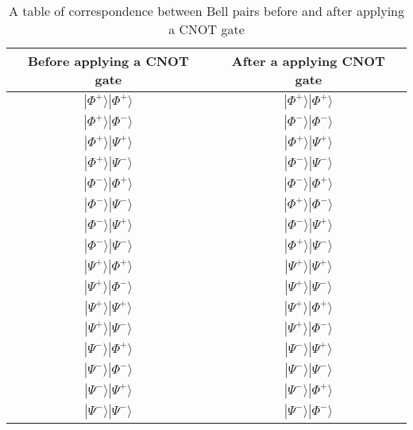 \begin{table}[ht]
  \begin{center}
    \begin{tabular}{|c|c|} \hline
      Before applying a CNOT gate & After a applying CNOT gate \\ \hline \cline{1-2}
      $|\Phi^+\rangle|\Phi^+\rangle$ &  $|\Phi^+\rangle|\Phi^+\rangle$ \\ \cline{1-2}
      $|\Phi^+\rangle|\Phi^-\rangle$ &  $|\Phi^-\rangle|\Phi^-\rangle$ \\ \cline{1-2}
      $|\Phi^+\rangle|\Psi^+\rangle$ &  $|\Phi^+\rangle|\Psi^+\rangle$ \\ \cline{1-2}
      $|\Phi^+\rangle|\Psi^-\rangle$ &  $|\Phi^-\rangle|\Psi^-\rangle$ \\ \cline{1-2}
      $|\Phi^-\rangle|\Phi^+\rangle$ &  $|\Phi^-\rangle|\Phi^+\rangle$ \\ \cline{1-2}
      $|\Phi^-\rangle|\Psi^-\rangle$ &  $|\Phi^+\rangle|\Phi^-\rangle$ \\ \cline{1-2}
      $|\Phi^-\rangle|\Psi^+\rangle$ &  $|\Phi^-\rangle|\Psi^+\rangle$ \\ \cline{1-2}
      $|\Phi^-\rangle|\Psi^-\rangle$ &  $|\Phi^+\rangle|\Psi^-\rangle$ \\ \cline{1-2}
      $|\Psi^+\rangle|\Phi^+\rangle$ &  $|\Psi^+\rangle|\Psi^+\rangle$ \\ \cline{1-2}
      $|\Psi^+\rangle|\Phi^-\rangle$ &  $|\Psi^+\rangle|\Psi^-\rangle$ \\ \cline{1-2}
      $|\Psi^+\rangle|\Psi^+\rangle$ &  $|\Psi^+\rangle|\Phi^+\rangle$ \\ \cline{1-2}
      $|\Psi^+\rangle|\Psi^-\rangle$ &  $|\Psi^+\rangle|\Phi^-\rangle$ \\ \cline{1-2}
      $|\Psi^-\rangle|\Phi^+\rangle$ &  $|\Psi^-\rangle|\Psi^+\rangle$ \\ \cline{1-2}
      $|\Psi^-\rangle|\Phi^-\rangle$ &  $|\Psi^-\rangle|\Psi^-\rangle$ \\ \cline{1-2}
      $|\Psi^-\rangle|\Psi^+\rangle$ &  $|\Psi^-\rangle|\Phi^+\rangle$ \\ \cline{1-2}
      $|\Psi^-\rangle|\Psi^-\rangle$ &  $|\Psi^-\rangle|\Phi^-\rangle$ \\ \cline{1-2}
    \end{tabular}
    \caption{A table of correspondence between Bell pairs before and after applying a CNOT gate}
  \end{center}
\end{table}


